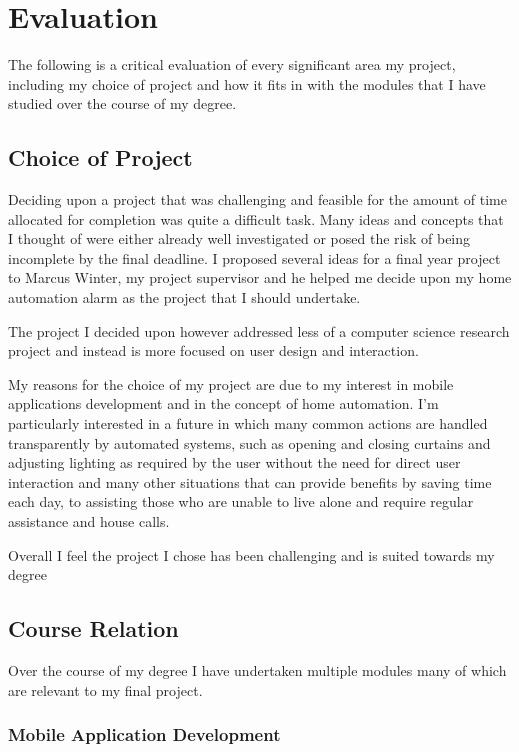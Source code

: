 \section{Evaluation}\label{evaluation}

The following is a critical evaluation of every significant area my
project, including my choice of project and how it fits in with the
modules that I have studied over the course of my degree.

\subsection{Choice of Project}\label{choice-of-project}

Deciding upon a project that was challenging and feasible for the amount
of time allocated for completion was quite a difficult task. Many ideas
and concepts that I thought of were either already well investigated or
posed the risk of being incomplete by the final deadline. I proposed
several ideas for a final year project to Marcus Winter, my project
supervisor and he helped me decide upon my home automation alarm as the
project that I should undertake.

The project I decided upon however addressed less of a computer science
research project and instead is more focused on user design and
interaction.

My reasons for the choice of my project are due to my interest in mobile
applications development and in the concept of home automation. I'm
particularly interested in a future in which many common actions are
handled transparently by automated systems, such as opening and closing
curtains and adjusting lighting as required by the user without the need
for direct user interaction and many other situations that can provide
benefits by saving time each day, to assisting those who are unable to
live alone and require regular assistance and house calls.

Overall I feel the project I chose has been challenging and is suited
towards my degree

\subsection{Course Relation}\label{course-relation}

Over the course of my degree I have undertaken multiple modules many of
which are relevant to my final project.

\subsubsection{Mobile Application
Development}\label{mobile-application-development}

